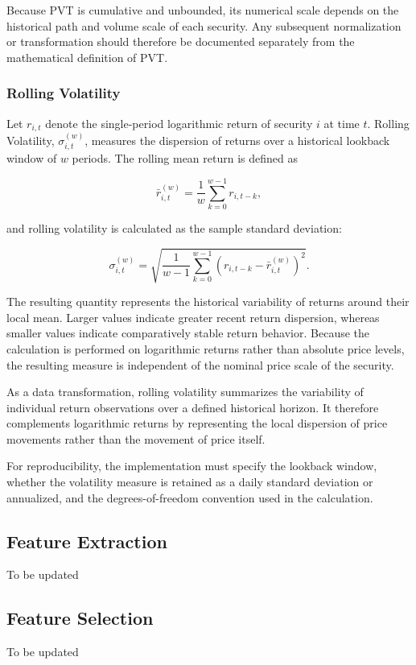 \medskip

Because PVT is cumulative and unbounded, its numerical scale depends on the historical path and volume scale of each security. Any subsequent normalization or transformation should therefore be documented separately from the mathematical definition of PVT.

\subsubsection{Rolling Volatility}
Let $r_{i,t}$ denote the single-period logarithmic return of security $i$ at time $t$. Rolling Volatility, $\sigma_{i,t}^{(w)}$, measures the dispersion of returns over a historical lookback window of $w$ periods. The rolling mean return is defined as

\begin{equation}
    \bar{r}_{i,t}^{(w)}
    =
    \frac{1}{w}
    \sum_{k=0}^{w-1}r_{i,t-k},
\end{equation}

and rolling volatility is calculated as the sample standard deviation:

\begin{equation}
    \sigma_{i,t}^{(w)}
    =
    \sqrt{
        \frac{1}{w-1}
        \sum_{k=0}^{w-1}
        \left(
        r_{i,t-k}
        -
        \bar{r}_{i,t}^{(w)}
        \right)^2
    }.
\end{equation}

The resulting quantity represents the historical variability of returns around their local mean. Larger values indicate greater recent return dispersion, whereas smaller values indicate comparatively stable return behavior. Because the calculation is performed on logarithmic returns rather than absolute price levels, the resulting measure is independent of the nominal price scale of the security.

\medskip

As a data transformation, rolling volatility summarizes the variability of individual return observations over a defined historical horizon. It therefore complements logarithmic returns by representing the local dispersion of price movements rather than the movement of price itself.

\medskip

For reproducibility, the implementation must specify the lookback window, whether the volatility measure is retained as a daily standard deviation or annualized, and the degrees-of-freedom convention used in the calculation.

\subsection{Feature Extraction}
To be updated

\subsection{Feature Selection}
To be updated